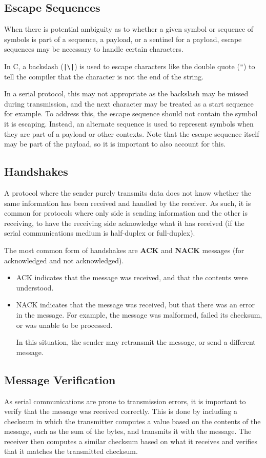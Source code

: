 \documentclass{report}
\begin{document}
\subsection{Escape Sequences}
When there is potential ambiguity as to whether a given symbol or sequence of symbols is
part of a sequence, a payload, or a sentinel for a payload, escape sequences may be
necessary to handle certain characters.

In C, a backslash (\texttt{|\backslash|}) is used to escape characters
like the double quote (\texttt{"}) to tell the compiler that the character is not the end of the string. %

In a serial protocol, this may not appropriate as the backslash may be missed during transmission,
and the next character may be treated as a start sequence for example. To address this, the escape
sequence should not contain the symbol it is escaping.
Instead, an alternate sequence is used to represent symbols when they are part of a payload or
other contexts. Note that the escape sequence itself may be part of the payload, so it is important
to also account for this.
\subsection{Handshakes}
A protocol where the sender purely transmits data does not know whether the same information
has been received and handled by the receiver. As such, it is common for protocols where
only side is sending information and the other is receiving, to have the receiving side
acknowledge what it has received (if the serial communications medium is half-duplex or full-duplex).

The most common form of handshakes are \textbf{ACK} and \textbf{NACK} messages (for acknowledged
and not acknowledged).
\begin{itemize}
    \item ACK indicates that the message was received, and that the contents were understood.
    \item NACK indicates that the message was received, but that there was an error in the message.
    For example, the message was malformed, failed its checksum, or was unable to be processed.

    In this situation, the sender may retransmit the message, or send a different message.
\end{itemize}
\subsection{Message Verification}
As serial communications are prone to transmission errors, it is important to verify that the
message was received correctly. This is done by including a checksum in which the transmitter
computes a value based on the contents of the message, such as the sum of the bytes, and
transmits it with the message. The receiver then computes a similar checksum based
on what it receives and verifies that it matches the transmitted checksum.
\end{document}
